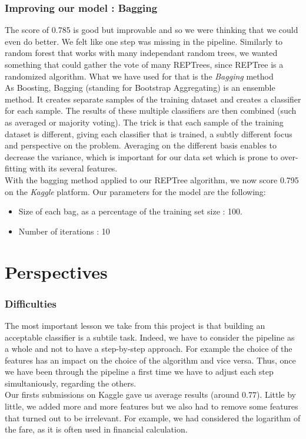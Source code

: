 \documentclass[11pt,a4paper,portrait]{article}
\begin{document}
\section{Improving our model : Bagging}
The score of 0.785 is good but improvable and so we were thinking that we could even do better. We felt like one step was missing in the pipeline. Similarly to random forest that works with many independant random trees, we wanted something that could gather the vote of many REPTrees, since REPTree is a randomized algorithm. What we have used for that is the \textit{Bagging} method\\
As Boosting, Bagging (standing for Bootstrap Aggregating) is an ensemble method. It creates separate samples of the training dataset and creates a classifier for each sample. The results of these multiple classifiers are then combined (such as averaged or majority voting). The trick is that each sample of the training dataset is different, giving each classifier that is trained, a subtly different focus and perspective on the problem. Averaging on the different basis enables to decrease the variance, which is important for our data set which is prone to over-fitting with its several features.\\
With the bagging method applied to our REPTree algorithm, we now score 0.795 on the \textit{Kaggle} platform. Our parameters for the model are the following:
\begin{itemize}
	\item Size of each bag, as a percentage of the training set size : 100. 
	\item Number of iterations : 10
\end{itemize} 

\part{Perspectives}
\setcounter{section}{0}

\section{Difficulties}
The most important lesson we take from this project is that building an acceptable classifier is a subtile task. Indeed, we have to consider the pipeline as a whole and not to have a step-by-step approach. For example the choice of the features has an impact on the choice of the algorithm and vice versa. Thus, once we have been through the pipeline a first time we have to adjust each step simultaniously, regarding the others.\\
Our firsts submissions on Kaggle gave us average results (around $0.77$). Little by little, we added more and more features but we also had to remove some features that turned out to be irrelevant. For example, we had considered the logarithm of the fare, as it is often used in financial calculation.
\end{document}
